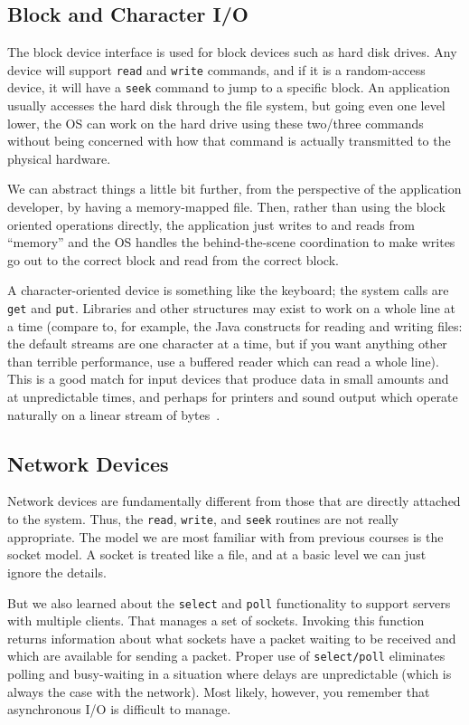\subsection*{Block and Character I/O}

The block device interface is used for block devices such as hard disk drives. Any device will support \texttt{read} and \texttt{write} commands, and if it is a random-access device, it will have a \texttt{seek} command to jump to a specific block. An application usually accesses the hard disk through the file system, but going even one level lower, the OS can work on the hard drive using these two/three commands without being concerned with how that command is actually transmitted to the physical hardware.

We can abstract things a little bit further, from the perspective of the application developer, by having a memory-mapped file. Then, rather than using the block oriented operations directly, the application just writes to and reads from ``memory'' and the OS handles the behind-the-scene coordination to make writes go out to the correct block and read from the correct block.

A character-oriented device is something like the keyboard; the system calls are \texttt{get} and \texttt{put}. Libraries and other structures may exist to work on a whole line at a time (compare to, for example, the Java constructs for reading and writing files: the default streams are one character at a time, but if you want anything other than terrible performance, use a buffered reader which can read a whole line). This is a good match for input devices that produce data in small amounts and at unpredictable times, and perhaps for printers and sound output which operate naturally on a linear stream of bytes~\cite{osc}.

\subsection*{Network Devices}

Network devices are fundamentally different from those that are directly attached to the system. Thus, the \texttt{read}, \texttt{write}, and \texttt{seek} routines are not really appropriate. The model we are most familiar with from previous courses is the socket model. A socket is treated like a file, and at a basic level we can just ignore the details.

But we also learned about the \texttt{select} and \texttt{poll} functionality to support servers with multiple clients. That manages a set of sockets. Invoking this function returns information about what sockets have a packet waiting to be received and which are available for sending a packet. Proper use of \texttt{select/poll} eliminates polling and busy-waiting in a situation where delays are unpredictable (which is always the case with the network). Most likely, however, you remember that asynchronous I/O is difficult to manage. 

